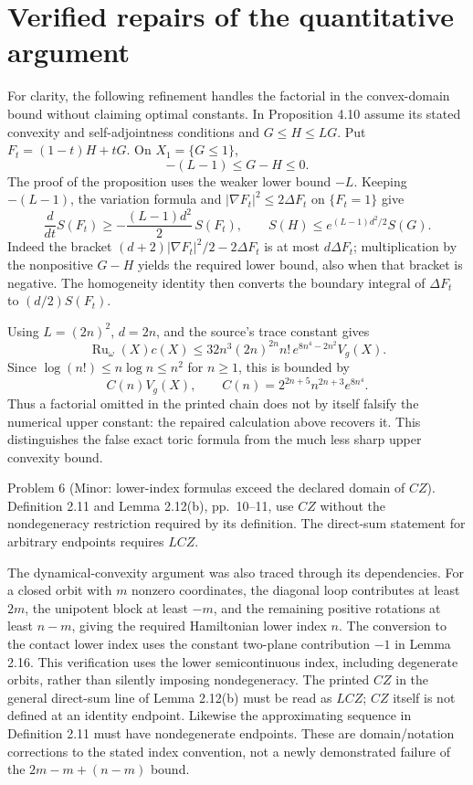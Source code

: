 \documentclass[10pt]{article}
\begin{document}
\section*{Verified repairs of the quantitative argument}
For clarity, the following refinement handles the factorial in the convex-domain bound without claiming optimal constants. In Proposition 4.10 assume its stated convexity and self-adjointness conditions and \(G\le H\le LG\). Put \(F_t=(1-t)H+tG\). On \(X_1=\{G\le1\}\), \[-(L-1)\le G-H\le0.\] The proof of the proposition uses the weaker lower bound \(-L\). Keeping \(-(L-1)\), the variation formula and \(|\nabla F_t|^2\le2\Delta F_t\) on \(\{F_t=1\}\) give \[\frac{d}{dt}S(F_t)\ge
       -\frac{(L-1)d^2}{2}\,S(F_t),\qquad
 S(H)\le e^{(L-1)d^2/2}S(G).\] Indeed the bracket \((d+2)|\nabla F_t|^2/2-2\Delta F_t\) is at most \(d\Delta F_t\); multiplication by the nonpositive \(G-H\) yields the required lower bound, also when that bracket is negative. The homogeneity identity then converts the boundary integral of \(\Delta F_t\) to \((d/2)S(F_t)\).\par
Using \(L=(2n)^2\), \(d=2n\), and the source’s trace constant gives \[\operatorname{Ru}_\omega(X)c(X)
 \le 32n^3(2n)^{2n}n!\,e^{8n^4-2n^2}V_g(X).\] Since \(\log(n!)\le n\log n\le n^2\) for \(n\ge1\), this is bounded by \[C(n)V_g(X),\qquad C(n)=2^{2n+5}n^{2n+3}e^{8n^4}.\] Thus a factorial omitted in the printed chain does not by itself falsify the numerical upper constant: the repaired calculation above recovers it. This distinguishes the false exact toric formula from the much less sharp upper convexity bound.\par
Problem 6 (Minor: lower-index formulas exceed the declared domain of \(CZ\)).  Definition 2.11 and Lemma 2.12(b), pp. 10–11, use \(CZ\) without the nondegeneracy restriction required by its definition. The direct-sum statement for arbitrary endpoints requires \(LCZ\).\par
The dynamical-convexity argument was also traced through its dependencies. For a closed orbit with \(m\) nonzero coordinates, the diagonal loop contributes at least \(2m\), the unipotent block at least \(-m\), and the remaining positive rotations at least \(n-m\), giving the required Hamiltonian lower index \(n\). The conversion to the contact lower index uses the constant two-plane contribution \(-1\) in Lemma 2.16. This verification uses the lower semicontinuous index, including degenerate orbits, rather than silently imposing nondegeneracy. The printed \(CZ\) in the general direct-sum line of Lemma 2.12(b) must be read as \(LCZ\); \(CZ\) itself is not defined at an identity endpoint. Likewise the approximating sequence in Definition 2.11 must have nondegenerate endpoints. These are domain/notation corrections to the stated index convention, not a newly demonstrated failure of the \(2m-m+(n-m)\) bound.\par
\end{document}
